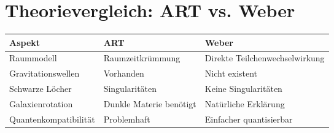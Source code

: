 \section{Theorievergleich: ART vs. Weber}
\begin{tabular}{|p{3.5cm}|p{3.8cm}|p{5cm}|}
\hline
\textbf{Aspekt} & \textbf{ART} & \textbf{Weber} \\
\hline
Raummodell & Raumzeitkrümmung & Direkte Teilchenwechselwirkung \\
\hline
Gravitationswellen & Vorhanden & Nicht existent \\
\hline
Schwarze Löcher & Singularitäten & Keine Singularitäten \\
\hline
Galaxienrotation & Dunkle Materie benötigt & Natürliche Erklärung \\
\hline
Quantenkompatibilität & Problemhaft & Einfacher quantisierbar \\
\hline
\end{tabular}
